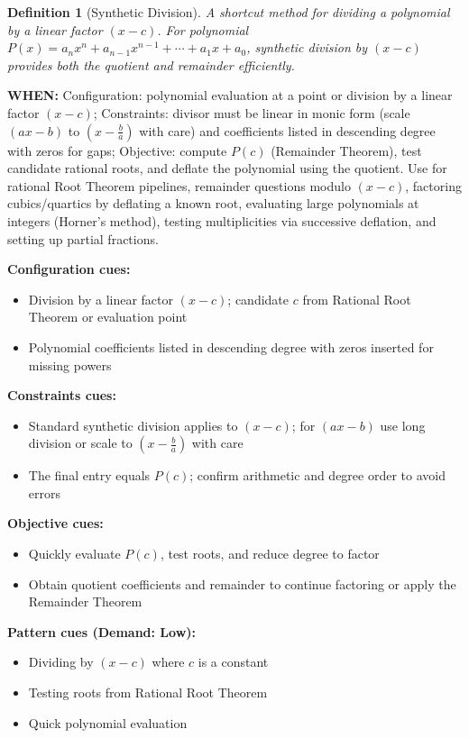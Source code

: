 \documentclass[12pt]{article}
\newtheorem{definition}{Definition}[section]
\begin{document}
\begin{definition}[Synthetic Division]
A shortcut method for dividing a polynomial by a linear factor $(x - c)$. For polynomial $P(x) = a_nx^n + a_{n-1}x^{n-1} + \cdots + a_1x + a_0$, synthetic division by $(x - c)$ provides both the quotient and remainder efficiently.
\end{definition}

\textbf{WHEN:} Configuration: polynomial evaluation at a point or division by a linear factor $(x-c)$; Constraints: divisor must be linear in monic form (scale $(ax-b)$ to $(x-\tfrac{b}{a})$ with care) and coefficients listed in descending degree with zeros for gaps; Objective: compute $P(c)$ (Remainder Theorem), test candidate rational roots, and deflate the polynomial using the quotient. Use for rational Root Theorem pipelines, remainder questions modulo $(x-c)$, factoring cubics/quartics by deflating a known root, evaluating large polynomials at integers (Horner's method), testing multiplicities via successive deflation, and setting up partial fractions.

\textbf{Configuration cues:}
\begin{itemize}
    \item Division by a linear factor $(x-c)$; candidate $c$ from Rational Root Theorem or evaluation point
    \item Polynomial coefficients listed in descending degree with zeros inserted for missing powers
\end{itemize}

\textbf{Constraints cues:}
\begin{itemize}
    \item Standard synthetic division applies to $(x-c)$; for $(ax-b)$ use long division or scale to $(x-\tfrac{b}{a})$ with care
    \item The final entry equals $P(c)$; confirm arithmetic and degree order to avoid errors
\end{itemize}

\textbf{Objective cues:}
\begin{itemize}
    \item Quickly evaluate $P(c)$, test roots, and reduce degree to factor
    \item Obtain quotient coefficients and remainder to continue factoring or apply the Remainder Theorem
\end{itemize}

\textbf{Pattern cues (Demand: Low):}
\begin{itemize}
    \item Dividing by $(x - c)$ where $c$ is a constant
    \item Testing roots from Rational Root Theorem
    \item Quick polynomial evaluation
\end{itemize}
\end{document}

